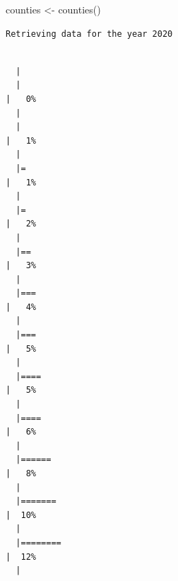 \documentclass[
  letterpaper,
  DIV=11,
  numbers=noendperiod]{scrreprt}
\newenvironment{Shaded}{\begin{snugshade}}{\end{snugshade}}
\newcommand{\FunctionTok}[1]{\textcolor[rgb]{0.28,0.35,0.67}{#1}}
\newcommand{\NormalTok}[1]{\textcolor[rgb]{0.00,0.23,0.31}{#1}}
\newcommand{\OtherTok}[1]{\textcolor[rgb]{0.00,0.23,0.31}{#1}}
\begin{document}
\begin{Shaded}
\begin{Highlighting}[]
\NormalTok{counties }\OtherTok{\textless{}{-}} \FunctionTok{counties}\NormalTok{()}
\end{Highlighting}
\end{Shaded}

\begin{verbatim}
Retrieving data for the year 2020
\end{verbatim}

\begin{verbatim}

  |                                                                            
  |                                                                      |   0%
  |                                                                            
  |                                                                      |   1%
  |                                                                            
  |=                                                                     |   1%
  |                                                                            
  |=                                                                     |   2%
  |                                                                            
  |==                                                                    |   3%
  |                                                                            
  |===                                                                   |   4%
  |                                                                            
  |===                                                                   |   5%
  |                                                                            
  |====                                                                  |   5%
  |                                                                            
  |====                                                                  |   6%
  |                                                                            
  |======                                                                |   8%
  |                                                                            
  |=======                                                               |  10%
  |                                                                            
  |========                                                              |  12%
  |                                                                            

\end{verbatim}
\end{document}
